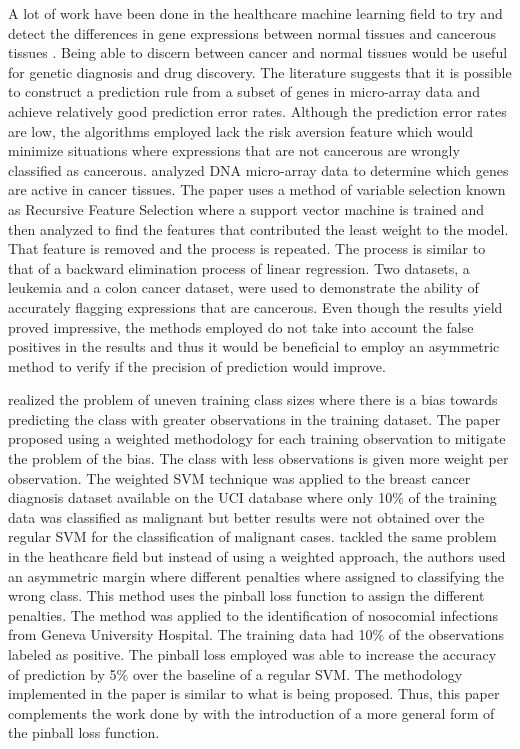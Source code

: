 A lot of work have been done in the healthcare machine learning field to try and detect the differences in gene expressions between normal tissues and cancerous tissues \citep{Ambroise02}\citep{Guyon02}. Being able to discern between cancer and normal tissues would be useful for genetic diagnosis and drug discovery. The literature suggests that it is possible to construct a prediction rule from a subset of genes in micro-array data and achieve relatively good prediction error rates. Although the prediction error rates are low, the algorithms employed lack the risk aversion feature which would minimize situations where expressions that are not cancerous are wrongly classified as cancerous. \citet{Guyon02} analyzed DNA micro-array data to determine which genes are active in cancer tissues. The paper uses a method of variable selection known as Recursive Feature Selection where a support vector machine is trained and then analyzed to find the features that contributed the least weight to the model. That feature is removed and the process is repeated. The process is similar to that of a backward elimination process of linear regression. Two datasets, a leukemia and a colon cancer dataset, were used to demonstrate the ability of accurately flagging expressions that are cancerous. Even though the results yield proved impressive, the methods employed do not take into account the false positives in the results and thus it would be beneficial to employ an asymmetric method to verify if the precision of prediction would improve.

\citet{Huang05} realized the problem of uneven training class sizes where there is a bias towards predicting the class with greater observations in the training dataset. The paper proposed using a weighted methodology for each training observation to mitigate the problem of the bias. The class with less observations is given more weight per observation. The weighted SVM technique was applied to the breast cancer diagnosis dataset available on the UCI database where only 10\% of the training data was classified as malignant but better results were not obtained over the regular SVM for the classification of malignant cases. \citet{Cohen03} tackled the same problem in the heathcare field but instead of using a weighted approach, the authors used an asymmetric margin where different penalties where assigned to classifying the wrong class. This method uses the pinball loss function to assign the different penalties. The method was applied to the identification of nosocomial infections from Geneva University Hospital. The training data had 10\% of the observations labeled as positive. The pinball loss employed was able to increase the accuracy of prediction by 5\% over the baseline of a regular SVM. The methodology implemented in the paper is similar to what is being proposed. Thus, this paper complements the work done by \citet{Quadrianto09} with the introduction of a more general form of the pinball loss function.

